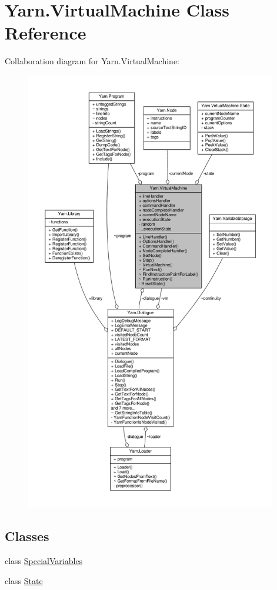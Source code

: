 \hypertarget{a00145}{\section{Yarn.\-Virtual\-Machine Class Reference}
\label{a00145}
}


Collaboration diagram for Yarn.\-Virtual\-Machine\-:
\nopagebreak
\begin{figure}[H]
\begin{center}
\leavevmode
\includegraphics[height=550pt]{a00634}
\end{center}
\end{figure}
\subsection*{Classes}
\begin{DoxyCompactItemize}
\item 
class \hyperlink{a00145_a00353}{Special\-Variables}
\item 
class \hyperlink{a00148}{State}
\end{DoxyCompactItemize}
